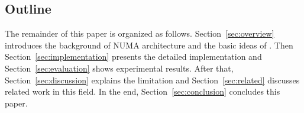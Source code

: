 \subsection*{Outline}

The remainder of this paper is organized as follows. Section~\ref{sec:overview} introduces the background of NUMA architecture and the basic ideas of \NP{}. Then Section~\ref{sec:implementation} presents the detailed implementation and Section~\ref{sec:evaluation} shows experimental results. After that, Section~\ref{sec:discussion} explains the limitation and  Section~\ref{sec:related} discusses related work in this field. In the end, Section~\ref{sec:conclusion} concludes this paper.


 





